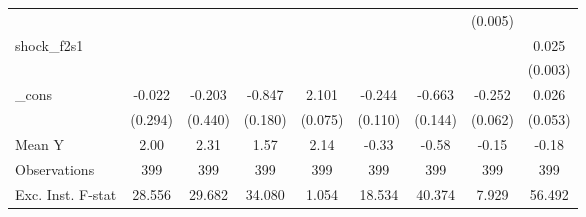{\begin{tabular}{l*{8}{c}}
            &                     &                     &                     &                     &                     &                     &     (0.005)         &                     \\
\addlinespace
shock\_f2s1  &                     &                     &                     &                     &                     &                     &                     &       0.025\sym{***}\\
            &                     &                     &                     &                     &                     &                     &                     &     (0.003)         \\
\addlinespace
\_cons      &      -0.022         &      -0.203         &      -0.847\sym{***}&       2.101\sym{***}&      -0.244\sym{**} &      -0.663\sym{***}&      -0.252\sym{***}&       0.026         \\
            &     (0.294)         &     (0.440)         &     (0.180)         &     (0.075)         &     (0.110)         &     (0.144)         &     (0.062)         &     (0.053)         \\
\midrule
Mean Y      &        2.00         &        2.31         &        1.57         &        2.14         &       -0.33         &       -0.58         &       -0.15         &       -0.18         \\
Observations&         399         &         399         &         399         &         399         &         399         &         399         &         399         &         399         \\
Exc. Inst. F-stat&      28.556         &      29.682         &      34.080         &       1.054         &      18.534         &      40.374         &       7.929         &      56.492         \\
\bottomrule
\end{tabular}
}
